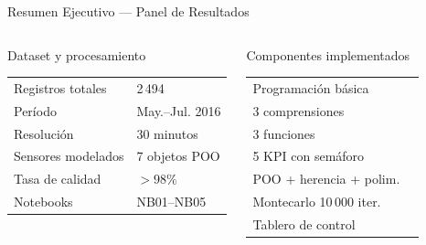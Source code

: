 \documentclass[11pt, aspectratio=169]{beamer}
\newcommand{\tick}{\textcolor{SmartGreen}{\ding{52}}}
\begin{document}
\begin{frame}{Resumen Ejecutivo --- Panel de Resultados}

\begin{columns}[t]
\begin{block}{Dataset y procesamiento}
\begin{tabular}{@{}ll@{}}
\footnotesize Registros totales & \footnotesize 2\,494 \\
\footnotesize Período & \footnotesize May.--Jul. 2016 \\
\footnotesize Resolución & \footnotesize 30 minutos \\
\footnotesize Sensores modelados & \footnotesize 7 objetos POO \\
\footnotesize Tasa de calidad & \footnotesize $>98\%$ \\
\footnotesize Notebooks & \footnotesize NB01--NB05 \\
\end{tabular}
\end{block}

\vspace{4pt}
\begin{block}{Componentes implementados}
\begin{tabular}{@{}lc@{}}
\footnotesize Programación básica & \footnotesize \tick \\
\footnotesize 3 comprensiones & \footnotesize \tick \\
\footnotesize 3 funciones & \footnotesize \tick \\
\footnotesize 5 KPI con semáforo & \footnotesize \tick \\
\footnotesize POO + herencia + polim. & \footnotesize \tick \\
\footnotesize Montecarlo 10\,000 iter. & \footnotesize \tick \\
\footnotesize Tablero de control & \footnotesize \tick \\
\end{tabular}
\end{block}


\end{columns}
\end{frame}
\end{document}
